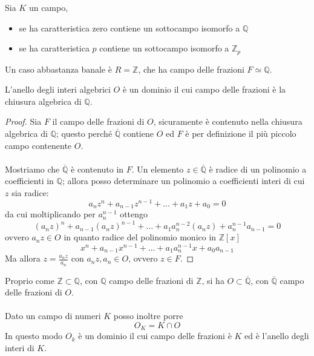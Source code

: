 \begin{proposizione}
	Sia $K$ un campo, 
	\begin{itemize}
		\item se ha caratteristica zero contiene un sottocampo isomorfo a $\mathbb{Q}$
		\item se ha caratteristica $p$ contiene un sottocampo isomorfo a $\mathbb{Z}_p$
	\end{itemize}
\end{proposizione}
\begin{esempio}
	Un caso abbastanza banale è $R=\mathbb{Z}$, che ha campo delle frazioni $F\simeq\mathbb{Q}$.
\end{esempio}
\begin{teorema}
	L'anello degli interi algebrici $O$ è un dominio il cui campo delle frazioni è la chiusura algebrica di $\mathbb{Q}$.
\end{teorema}
\begin{proof}
	Sia $F$ il campo delle frazioni di $O$, sicuramente è contenuto nella chiusura algebrica di $\mathbb{Q}$; questo perché $\overline{\mathbb{Q}}$ contiene $O$ ed $F$ è per definizione il più piccolo campo contenente $O$. \\ \\ Mostriamo che $\overline{\mathbb{Q}}$ è contenuto in $F$. Un elemento $z\in\overline{\mathbb{Q}}$ è radice di un polinomio a coefficienti in $\mathbb{Q}$; allora posso determinare un polinomio a coefficienti interi di cui $z$ sia radice:
	\begin{equation*}
	a_nz^n+a_{n-1}z^{n-1}+\dots+a_1z+a_0=0
	\end{equation*}
	da cui moltiplicando per $a_n^{n-1}$ ottengo
	\begin{equation*}
	(a_nz)^n+a_{n-1}(a_nz)^{n-1}+\dots+a_1a_n^{n-2}(a_nz)+a_n^{n-1}a_{n-1}=0
	\end{equation*}
	ovvero $a_nz\in O$ in quanto radice del polinomio monico in $\mathbb{Z}[x]$
	\begin{equation*}
	x^n+a_{n-1}x^{n-1}+\dots+a_1a_n^{n-1}x+a_0a_{n-1}
	\end{equation*}
	Ma allora $z=\frac{a_nz}{a_n}$ con $a_nz,a_n\in O$, ovvero $z\in F$.
\end{proof}
\begin{osservazione}
	Proprio come $\mathbb{Z}\subset\mathbb{Q}$, con $\mathbb{Q}$ campo delle frazioni di $\mathbb{Z}$, si ha $O\subset\overline{\mathbb{Q}}$, con $\overline{\mathbb{Q}}$ campo delle frazioni di $O$. \\ \\ Dato un campo di numeri $K$ posso inoltre porre 
	\begin{equation*}
	O_K=K\cap O
	\end{equation*}
	In questo modo $O_k$ è un dominio il cui campo delle frazioni è $K$ ed è l'anello degli interi di $K$.
\end{osservazione}
